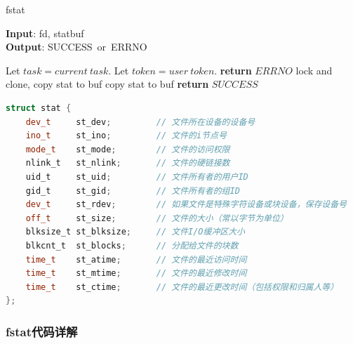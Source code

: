\begin{algorithm}[tb]
    \caption{fstat}
    \label{alg:algorithm}
    \textbf{Input}: fd, statbuf\\
    \textbf{Output}: SUCCESS~or~ERRNO
    \begin{algorithmic}[1] %

        \State Let $task=current~task$.
        \State Let $token=user~token$.
        \State \textbf{return} $ERRNO$
        \Else {}
        \State lock and clone, copy stat to buf
        \Else
        \State copy stat to buf
        \EndIf
        \State \textbf{return} $SUCCESS$
        \EndIf
    \end{algorithmic}
\end{algorithm}



\begin{algorithm}[tb]
\centering
\begin{lstlisting}[language={Rust}, 
	caption={stat示意结构体}]
    struct stat {
    dev_t     st_dev;         // 文件所在设备的设备号
    ino_t     st_ino;         // 文件的i节点号
    mode_t    st_mode;        // 文件的访问权限
    nlink_t   st_nlink;       // 文件的硬链接数
    uid_t     st_uid;         // 文件所有者的用户ID
    gid_t     st_gid;         // 文件所有者的组ID
    dev_t     st_rdev;        // 如果文件是特殊字符设备或块设备，保存设备号
    off_t     st_size;        // 文件的大小（常以字节为单位）
    blksize_t st_blksize;     // 文件I/O缓冲区大小
    blkcnt_t  st_blocks;      // 分配给文件的块数
    time_t    st_atime;       // 文件的最近访问时间
    time_t    st_mtime;       // 文件的最近修改时间
    time_t    st_ctime;       // 文件的最近更改时间（包括权限和归属人等）
};
\end{lstlisting}
\end{algorithm}

\subsubsection{fstat代码详解}

